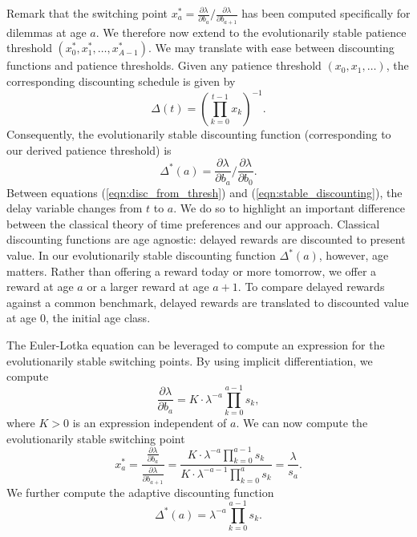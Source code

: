 \documentclass[titlepage, hidelinks, 12pt]{article}
\theoremstyle{plain}
\theoremstyle{remark}
\theoremstyle{definition}
\newcommand{\varSS}{\frac{\partial \lambda}{ \partial b_{a}}}
\newcommand{\varLL}{\frac{\partial \lambda}{ \partial b_{a+1}}}
\begin{document}
Remark that the switching point $x_a^* =  \varSS/\varLL$ has been computed specifically for dilemmas at age $a$. We therefore now extend to
the evolutionarily stable patience threshold $(x_0^*, x_1^*, \ldots, x_{A-1}^*)$. 
We may translate with ease between discounting functions and patience thresholds. Given any patience threshold $(x_0, x_1, \ldots)$, the corresponding
discounting schedule is given by 
\begin{equation}
    \Delta(t) = \left( \prod\limits_{k = 0}^{t - 1} x_k \right)^{-1}. \label{eqn:disc_from_thresh}
\end{equation}
Consequently, the evolutionarily stable discounting function (corresponding to our derived patience threshold) is
\begin{equation}
    \Delta^*(a) = \varSS/\frac{\partial \lambda}{\partial b_0}. 
    \label{eqn:stable_discounting}
\end{equation}
Between equations (\ref{eqn:disc_from_thresh}) and (\ref{eqn:stable_discounting}), the delay variable changes from $t$ to $a$. 
We do so to highlight an important difference between the classical theory of time preferences and our approach. 
Classical discounting functions are age agnostic: delayed rewards are discounted to present value. In our evolutionarily stable discounting
function $\Delta^*(a)$, however, age matters. Rather than offering a reward today or more tomorrow, we offer a reward at age $a$ or a larger
reward at age $a+1$. To compare delayed rewards against a common benchmark, delayed rewards are translated to discounted value at
age $0$, the initial age class. 

The Euler-Lotka equation can be leveraged to compute an expression for the evolutionarily stable switching points. By using
implicit differentiation, we compute
\begin{equation}
    \frac{\partial \lambda}{\partial b_a} = K\cdot \lambda^{-a} \prod\limits_{k = 0}^{a-1}s_k,
\end{equation}
where $K>0$ is an expression independent of $a$. We can now compute the evolutionarily stable switching point 
\begin{equation}
    x_a^* = \frac{\varSS}{\varLL} = \frac{K\cdot \lambda^{-a} \prod\limits_{k = 0}^{a-1}s_k}{K\cdot \lambda^{-a-1} \prod\limits_{k = 0}^{a}s_k} = \frac{\lambda}{s_a}.
\end{equation}
We further compute the adaptive discounting function
\begin{equation}
    \Delta^*(a) = \lambda^{-a}\prod\limits_{k = 0}^{a-1} s_k.
\end{equation}
\end{document}
